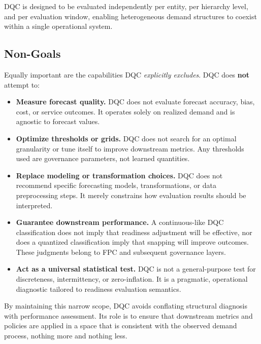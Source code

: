 DQC is designed to be evaluated independently per entity, per hierarchy level,
and per evaluation window, enabling heterogeneous demand structures to coexist
within a single operational system.

\subsection{Non-Goals}

Equally important are the capabilities DQC \emph{explicitly excludes}. DQC does
\textbf{not} attempt to:

\begin{itemize}
  \item \textbf{Measure forecast quality.}
  DQC does not evaluate forecast accuracy, bias, cost, or service outcomes. It
  operates solely on realized demand and is agnostic to forecast values.

  \item \textbf{Optimize thresholds or grids.}
  DQC does not search for an optimal granularity or tune itself to improve
  downstream metrics. Any thresholds used are governance parameters, not learned
  quantities.

  \item \textbf{Replace modeling or transformation choices.}
  DQC does not recommend specific forecasting models, transformations, or data
  preprocessing steps. It merely constrains how evaluation results should be
  interpreted.

  \item \textbf{Guarantee downstream performance.}
  A continuous-like DQC classification does not imply that readiness adjustment
  will be effective, nor does a quantized classification imply that snapping will
  improve outcomes. These judgments belong to FPC and subsequent governance
  layers.

  \item \textbf{Act as a universal statistical test.}
  DQC is not a general-purpose test for discreteness, intermittency, or
  zero-inflation. It is a pragmatic, operational diagnostic tailored to readiness
  evaluation semantics.
\end{itemize}

By maintaining this narrow scope, DQC avoids conflating structural diagnosis with
performance assessment. Its role is to ensure that downstream metrics and
policies are applied in a space that is consistent with the observed demand
process, nothing more and nothing less.
